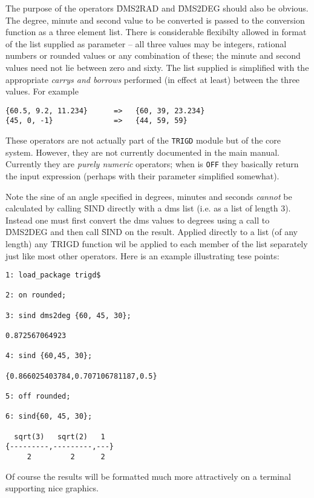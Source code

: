 The purpose of the operators  \f{DMS2RAD} and \f{DMS2DEG} should  also be obvious.  The degree, minute and second value to be converted is passed to the conversion function as a three element list.  There is considerable flexibilty allowed in  format of the list supplied as parameter -- all three values may be integers, rational numbers or rounded values or any combination of these; the minute and second values need not lie between zero and sixty.  The list supplied is simplified with the appropriate \textit{carrys and borrows} performed (in effect at least) between the three values.  For example
\begin{verbatim} 
{60.5, 9.2, 11.234}      =>   {60, 39, 23.234}
{45, 0, -1}              =>   {44, 59, 59}
\end{verbatim}

These operators are not actually part of the \texttt{TRIGD} module but of the {\REDUCE} core system. However, they are not currently documented in the main manual.  Currently they are \emph{purely numeric} operators; when  is \texttt{OFF} they basically return the input expression (perhaps with their parameter simplified somewhat).  

Note the sine of an angle specified in degrees, minutes and seconds \emph{cannot} be calculated by calling \f{SIND} directly with a dms list (i.e. as a list of length 3).  Instead one must first convert the dms values to degrees using a call to \f{DMS2DEG} and then call \f{SIND} on the result.  Applied directly to a list (of any length) any \f{TRIGD} function wil be applied to each member of the list separately just like most other {\REDUCE} operators. Here is an example illustrating tese points:
\begin{verbatim}
1: load_package trigd$

2: on rounded;

3: sind dms2deg {60, 45, 30};

0.872567064923

4: sind {60,45, 30};

{0.866025403784,0.707106781187,0.5}

5: off rounded;

6: sind{60, 45, 30};

  sqrt(3)   sqrt(2)   1
{---------,---------,---}
     2         2      2

\end{verbatim}
 
Of course the results will be formatted much more attractively on a terminal supporting nice graphics.

